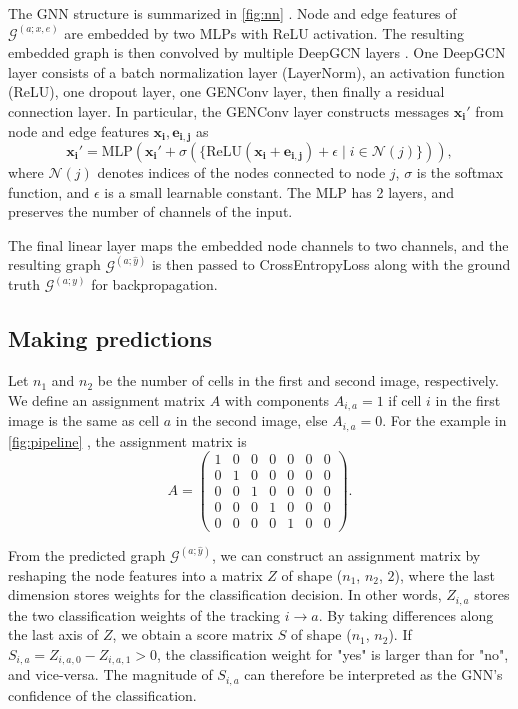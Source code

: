 \documentclass[10pt,conference,compsocconf,a4paper]{IEEEtran}
\newcommand{\G}{\mathcal{G}}
\renewcommand{\vec}[1]{\boldsymbol{#1}}
\newcommand*{\shortautoref}[1]{%
	\begingroup
	\def\equationautorefname{\textsc{Eq.}}%
	\def\tableautorefname{\textsc{Tab.}}%
	\def\figureautorefname{\textsc{Fig.}}%
	\autoref{#1}%
	\endgroup
}
\begin{document}
		The GNN structure is summarized in \shortautoref{fig:nn}. Node and edge features of $\G^{(a;x,e)}$ are embedded by two MLPs with ReLU activation. The resulting embedded graph is then convolved by multiple DeepGCN layers \cite{li_deepergcn_2020}. One DeepGCN layer consists of a batch normalization layer (LayerNorm), an activation function (ReLU), one dropout layer, one GENConv layer, then finally a residual connection layer. In particular, the GENConv layer constructs messages $\vec{x_i}'$ from node and edge features $\vec{x_i}, \vec{e_{i,j}}$ as
		$$
			\vec{x_i}' = \textrm{MLP}(\vec{x_i}' + \sigma(\{\textrm{ReLU}(\vec{x_i} + \vec{e_{i,j}}) + \epsilon \;|\; i \in \mathcal{N}(j)\})),
		$$
		where $\mathcal{N}(j)$ denotes indices of the nodes connected to node $j$, $\sigma$ is the softmax function, and $\epsilon$ is a small learnable constant. The $\textrm{MLP}$ has 2 layers, and preserves the number of channels of the input.

		The final linear layer maps the embedded node channels to two channels, and the resulting graph $\G^{(a;\hat y)}$ is then passed to CrossEntropyLoss along with the ground truth $\G^{(a;y)}$ for backpropagation.

	\subsection{Making predictions} \label{sec:methods:pred}

		Let $n_1$ and $n_2$ be the number of cells in the first and second image, respectively. We define an assignment matrix $A$ with components $A_{i,a} = 1$ if cell $i$ in the first image is the same as cell $a$ in the second image, else $A_{i,a} = 0$. For the example in \shortautoref{fig:pipeline}, the assignment matrix is
		$$
			A = \begin{pmatrix}
				1 & 0 & 0 & 0 & 0 & 0 & 0 \\
				0 & 1 & 0 & 0 & 0 & 0 & 0 \\
				0 & 0 & 1 & 0 & 0 & 0 & 0 \\
				0 & 0 & 0 & 1 & 0 & 0 & 0 \\
				0 & 0 & 0 & 0 & 1 & 0 & 0
			\end{pmatrix}.
		$$

		From the predicted graph $\G^{(a;\hat y)}$, we can construct an assignment matrix by reshaping the node features into a matrix $Z$ of shape ($n_1$, $n_2$, $2$), where the last dimension stores weights for the classification decision.
		In other words, $Z_{i,a}$ stores the two classification weights of the tracking $i \rightarrow a$. By taking differences along the last axis of $Z$, we obtain a score matrix $S$ of shape ($n_1$, $n_2$). If $S_{i,a} = Z_{i,a,0} - Z_{i,a,1} > 0$, the classification weight for "yes" is larger than for "no", and vice-versa. The magnitude of $S_{i,a}$ can therefore be interpreted as the GNN's confidence of the classification.
\end{document}
